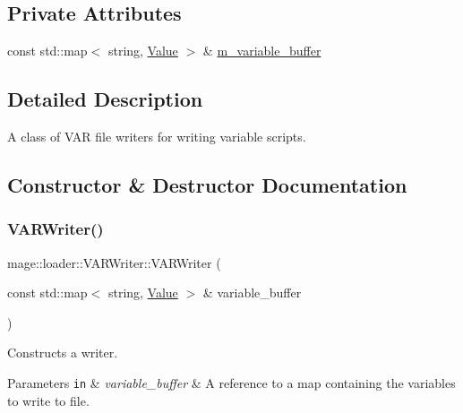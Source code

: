\subsection*{Private Attributes}
\begin{DoxyCompactItemize}
\item 
const std\+::map$<$ string, \mbox{\hyperlink{namespacemage_aa1fe0628487e0706e44efdc62dbdb3a2}{Value}} $>$ \& \mbox{\hyperlink{classmage_1_1loader_1_1_v_a_r_writer_a405d288ded715f12f6f3c8cf29beb6a6}{m\+\_\+variable\+\_\+buffer}}
\end{DoxyCompactItemize}


\subsection{Detailed Description}
A class of V\+AR file writers for writing variable scripts. 

\subsection{Constructor \& Destructor Documentation}
\mbox{\label{classmage_1_1loader_1_1_v_a_r_writer_af9b9e552dc77446790bbd52390b42582}} 
\subsubsection{\texorpdfstring{V\+A\+R\+Writer()}{VARWriter()}\hspace{0.1cm}{\footnotesize\ttfamily [1/3]}}
{\footnotesize\ttfamily mage\+::loader\+::\+V\+A\+R\+Writer\+::\+V\+A\+R\+Writer (\begin{DoxyParamCaption}\item[{const std\+::map$<$ string, \mbox{\hyperlink{namespacemage_aa1fe0628487e0706e44efdc62dbdb3a2}{Value}} $>$ \&}]{variable\+\_\+buffer }\end{DoxyParamCaption})\hspace{0.3cm}{\ttfamily [explicit]}}

Constructs a writer.


\begin{DoxyParams}[1]{Parameters}
\mbox{\tt in}  & {\em variable\+\_\+buffer} & A reference to a map containing the variables to write to file. \\
\hline
\end{DoxyParams}
\mbox{\label{classmage_1_1loader_1_1_v_a_r_writer_a5ddb3fcd75952ecc8593bc284dc3db0e}} 
